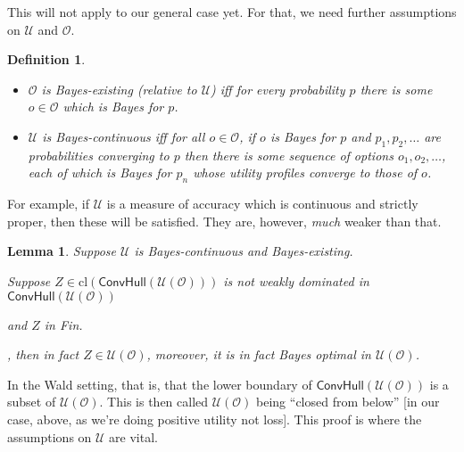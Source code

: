 \documentclass[a4paper]{article}
\newtheorem{definition}{Definition}
\newtheorem{lemma}[theorem]{Lemma}
\newtheorem{corollary}[theorem]{Corollary}
\newcommand\cl{\mathrm{cl}}
\renewcommand\O{\mathcal{O}}
\newcommand\Uwald{\mathcal{U}} %
\newcommand{\Conv}{\mathsf{ConvHull}}
\newenvironment{CCM rewritten}
{\begingroup\color{blue}} %
{\endgroup}              %
\begin{document}
	
	
	
	This will not apply to our general case yet. For that, we need further assumptions on $\Uwald$ and $\O$. 



\begin{definition}\ 
	\begin{itemize}
		\item $\O$ is \emph{Bayes-existing} (relative to $\Uwald$) iff for every probability $p$ there is some $o\in\O$ which is Bayes for $p$.
		\item $\Uwald$ is \emph{Bayes-continuous} iff for all $o\in\O$, if $o$ is Bayes for $p$ and $p_1,p_2,\ldots$ are probabilities converging to $p$ then there is some sequence of options $o_1,o_2,\ldots$, each of which is Bayes for $p_n$ whose utility profiles converge to those of $o$. 
	\end{itemize}
\end{definition}
For example, if $\Uwald$ is a measure of accuracy which is continuous and strictly proper, then these will be satisfied. They are, however, \emph{much} weaker than that.
	
	\begin{lemma}\label{thm:cct:bdry are the Bayes optimal}
		Suppose $\Uwald$ is Bayes-continuous and Bayes-existing. 
		
		
		Suppose $Z\in\cl(\Conv(\Uwald(\O)))$ is not weakly dominated in $\Conv(\Uwald(\O))$\begin{infversion}
			and $Z$ in Fin.
		\end{infversion}, then in fact $Z\in \Uwald(\O)$, moreover, it is in fact Bayes optimal in $\Uwald(\O)$. 
%		
	\end{lemma}
	In the Wald setting, that is, that the lower boundary of $\Conv(\Uwald(\O))$ is a subset of $\Uwald(\O)$. This is then called $\Uwald(\O)$ being ``closed from below'' [in our case, above, as we're doing positive utility not loss]. This proof is where the assumptions on $\Uwald$ are vital. 
	
\end{document}
